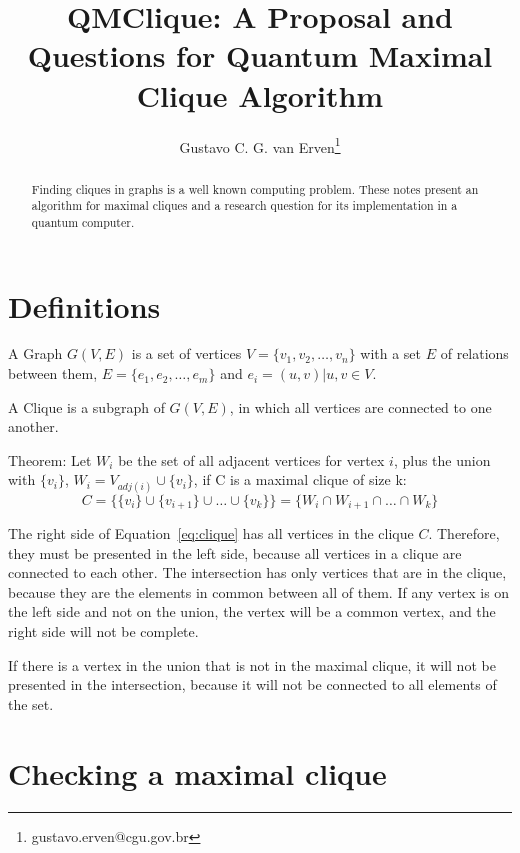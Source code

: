 \documentclass[a4paper,12pt]{article}
\begin{document}
\title{QMClique: A Proposal and Questions for Quantum Maximal Clique Algorithm}
\author{Gustavo C. G. van Erven\footnote{gustavo.erven@cgu.gov.br}}
\maketitle

\begin{abstract}
	Finding cliques in graphs is a well known computing problem. These notes present an algorithm for maximal cliques and a research question for its implementation in a quantum computer. 
\end{abstract}

\section{Definitions}

A Graph $G(V,E)$ is a set of vertices $V = \{v_1,v_2,\dots,v_n\}$ with a set $E$ of relations between them, $E = \{e_1,e_2,\dots,e_m\}$ and $e_i = (u,v) | u,v \in V$.

A Clique is a subgraph of $G(V,E)$, in which all vertices are connected to one another.

Theorem: Let $W_i$ be the set of all adjacent vertices for vertex $i$, plus the union with $\{v_i\}$, $W_i = V_{adj(i)} \cup \{v_i\}$, if C is a maximal clique of size k:
\begin{equation}\label{eq:clique}
C = \{\{v_i\} \cup \{v_{i+1}\} \cup \dots \cup \{v_k\}\} = \{W_i \cap W_{i+1} \cap \dots \cap W_{k}\}
\end{equation}

The right side of Equation~\ref{eq:clique} has all vertices in the clique $C$. Therefore, they must be presented in the left side, because all vertices in a clique are connected to each other. The intersection has only vertices that are in the clique, because they are the elements in common between all of them. If any vertex is on the left side and not on the union, the vertex will be a common vertex, and the right side will not be complete. 

If there is a vertex in the union that is not in the maximal clique, it will not be presented in the intersection, because it will not be connected to all elements of the set.

\section{Checking a maximal clique}
\end{document}
